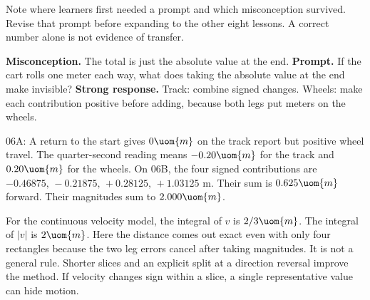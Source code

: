 Note where learners first needed a prompt and which misconception survived. Revise that prompt before expanding to the other eight lessons. A correct number alone is not evidence of transfer.

\clearpage
{}


\textbf{Misconception.} The total is just the absolute value at the end. \textbf{Prompt.} If the cart rolls one meter each way, what does taking the absolute value at the end make invisible? \textbf{Strong response.} Track: combine signed changes. Wheels: make each contribution positive before adding, because both legs put meters on the wheels.

06A: A return to the start gives \(0\uom{m}\) on the track report but positive wheel travel. The quarter-second reading means \(-0.20\uom{m}\) for the track and \(0.20\uom{m}\) for the wheels. On 06B, the four signed contributions are \(-0.46875,\,-0.21875,\,+0.28125,\,+1.03125\) m. Their sum is \(0.625\uom{m}\) forward. Their magnitudes sum to \(2.000\uom{m}\).

For the continuous velocity model, the integral of \(v\) is \(2/3\uom{m}\). The integral of \(\lvert v\rvert\) is \(2\uom{m}\). Here the distance comes out exact even with only four rectangles because the two leg errors cancel after taking magnitudes. It is not a general rule. Shorter slices and an explicit split at a direction reversal improve the method. If velocity changes sign within a slice, a single representative value can hide motion.

